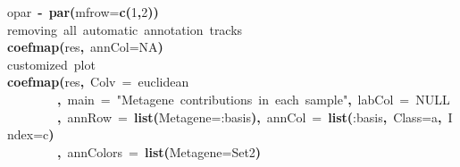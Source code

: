 \documentclass[a4paper]{article}\usepackage{graphicx, color}
\makeatletter
\newcommand{\hlnumber}[1]{\textcolor[rgb]{0,0,0}{#1}}%
\newcommand{\hlfunctioncall}[1]{\textcolor[rgb]{0.501960784313725,0,0.329411764705882}{\textbf{#1}}}%
\newcommand{\hlstring}[1]{\textcolor[rgb]{0.6,0.6,1}{#1}}%
\newcommand{\hlkeyword}[1]{\textcolor[rgb]{0,0,0}{\textbf{#1}}}%
\newcommand{\hlargument}[1]{\textcolor[rgb]{0.690196078431373,0.250980392156863,0.0196078431372549}{#1}}%
\newcommand{\hlcomment}[1]{\textcolor[rgb]{0.180392156862745,0.6,0.341176470588235}{#1}}%
\newcommand{\hlassignement}[1]{\textcolor[rgb]{0,0,0}{\textbf{#1}}}%
\newcommand{\hlsymbol}[1]{\textcolor[rgb]{0,0,0}{#1}}%
\newcommand{\hlstd}[1]{\textcolor[rgb]{0,0,0}{#1}}%
\newenvironment{kframe}{%
 \def\FrameCommand##1{\hskip\@totalleftmargin \hskip-\fboxsep
 \colorbox{shadecolor}{##1}\hskip-\fboxsep
     \hskip-\linewidth \hskip-\@totalleftmargin \hskip\columnwidth}%
 \MakeFramed {\advance\hsize-\width
   \@totalleftmargin\z@ \linewidth\hsize
   \@setminipage}}%
 {\par\unskip\endMakeFramed}
\newenvironment{knitrout}{}{} %
\makeatother
\begin{document}
\begin{knitrout}
\color{fgcolor}\begin{kframe}
\begin{flushleft}
\ttfamily\noindent
\hlsymbol{opar}{\ }\hlassignement{\usebox{\hlnormalsizeboxlessthan}-}{\ }\hlfunctioncall{par}\hlkeyword{(}\hlargument{mfrow}\hlargument{=}\hlfunctioncall{c}\hlkeyword{(}\hlnumber{1}\hlkeyword{,}\hlnumber{2}\hlkeyword{)}\hlkeyword{)}\hspace*{\fill}\\
\hlstd{}\hlcomment{\usebox{\hlnormalsizeboxhash}{\ }removing{\ }all{\ }automatic{\ }annotation{\ }tracks}\hspace*{\fill}\\
\hlstd{}\hlfunctioncall{coefmap}\hlkeyword{(}\hlsymbol{res}\hlkeyword{,}{\ }\hlargument{annCol}\hlargument{=}\hlnumber{NA}\hlkeyword{)}\hspace*{\fill}\\
\hlstd{}\hlcomment{\usebox{\hlnormalsizeboxhash}{\ }customized{\ }plot}\hspace*{\fill}\\
\hlstd{}\hlfunctioncall{coefmap}\hlkeyword{(}\hlsymbol{res}\hlkeyword{,}{\ }\hlargument{Colv}{\ }\hlargument{=}{\ }\hlstring{\usebox{\hlnormalsizeboxsinglequote}euclidean\usebox{\hlnormalsizeboxsinglequote}}\hspace*{\fill}\\
\hlstd{}{\ }{\ }{\ }{\ }{\ }{\ }{\ }{\ }\hlkeyword{,}{\ }\hlargument{main}{\ }\hlargument{=}{\ }\hlstring{"{}Metagene{\ }contributions{\ }in{\ }each{\ }sample"{}}\hlkeyword{,}{\ }\hlargument{labCol}{\ }\hlargument{=}{\ }NULL\hspace*{\fill}\\
\hlstd{}{\ }{\ }{\ }{\ }{\ }{\ }{\ }{\ }\hlkeyword{,}{\ }\hlargument{annRow}{\ }\hlargument{=}{\ }\hlfunctioncall{list}\hlkeyword{(}\hlargument{Metagene}\hlargument{=}\hlstring{\usebox{\hlnormalsizeboxsinglequote}:basis\usebox{\hlnormalsizeboxsinglequote}}\hlkeyword{)}\hlkeyword{,}{\ }\hlargument{annCol}{\ }\hlargument{=}{\ }\hlfunctioncall{list}\hlkeyword{(}\hlstring{\usebox{\hlnormalsizeboxsinglequote}:basis\usebox{\hlnormalsizeboxsinglequote}}\hlkeyword{,}{\ }\hlargument{Class}\hlargument{=}\hlsymbol{a}\hlkeyword{,}{\ }\hlargument{Index}\hlargument{=}\hlsymbol{c}\hlkeyword{)}\hspace*{\fill}\\
\hlstd{}{\ }{\ }{\ }{\ }{\ }{\ }{\ }{\ }\hlkeyword{,}{\ }\hlargument{annColors}{\ }\hlargument{=}{\ }\hlfunctioncall{list}\hlkeyword{(}\hlargument{Metagene}\hlargument{=}\hlstring{\usebox{\hlnormalsizeboxsinglequote}Set2\usebox{\hlnormalsizeboxsinglequote}}\hlkeyword{)}\hspace*{\fill}\\

\end{flushleft}
\end{kframe}
\end{knitrout}
\end{document}

